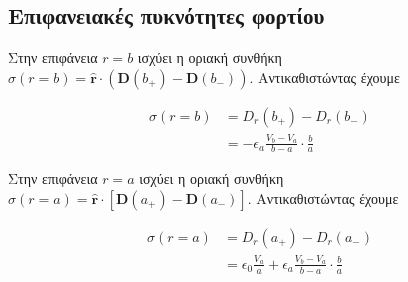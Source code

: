\subsection{Επιφανειακές πυκνότητες φορτίου}

Στην επιφάνεια $r=b$ ισχύει η οριακή συνθήκη $\sigma(r=b) =
\hat{\mathbf{r}}\cdot(\textbf{D}(b_{+}) - \textbf{D}(b_{-}))$. Αντικαθιστώντας έχουμε

\begin{equation} \label{eq1}
\begin{split}
  \sigma(r=b) & = D_{r}(b_{+}) - D_{r}(b_{-}) \\
              & = -\epsilon_{a}\frac{V_{b} - V_{a}}{b-a}\cdot\frac{b}{a}
\end{split}
\end{equation}

Στην επιφάνεια $r=a$ ισχύει η οριακή συνθήκη $\sigma(r=a) =
\hat{\mathbf{r}}\cdot[\textbf{D}(a_{+}) - \textbf{D}(a_{-})]$. Αντικαθιστώντας έχουμε

\begin{equation} \label{eq1}
\begin{split}
  \sigma(r=a) & = D_{r}(a_{+}) - D_{r}(a_{-}) \\
              & = \epsilon_{0}\frac{V_{a}}{a} + \epsilon_{a}\frac{V_{b} - V_{a}}{b-a}\cdot\frac{b}{a}
\end{split}
\end{equation}

